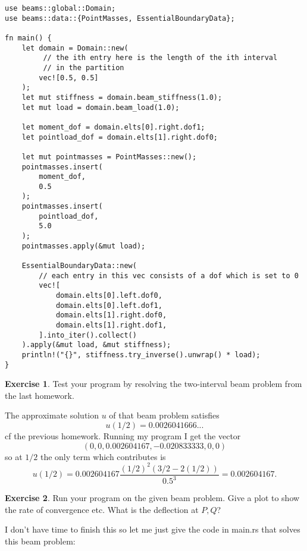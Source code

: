\documentclass[10pt]{article}
\theoremstyle{definition}
\newtheorem{exer}{Exercise}
\begin{document}
\begin{verbatim}
use beams::global::Domain;
use beams::data::{PointMasses, EssentialBoundaryData};

fn main() {
    let domain = Domain::new(
         // the ith entry here is the length of the ith interval
         // in the partition
        vec![0.5, 0.5]
    );
    let mut stiffness = domain.beam_stiffness(1.0);
    let mut load = domain.beam_load(1.0);

    let moment_dof = domain.elts[0].right.dof1;
    let pointload_dof = domain.elts[1].right.dof0;
    
    let mut pointmasses = PointMasses::new();
    pointmasses.insert(
        moment_dof,
        0.5
    );
    pointmasses.insert(
        pointload_dof,
        5.0
    );
    pointmasses.apply(&mut load);

    EssentialBoundaryData::new(
        // each entry in this vec consists of a dof which is set to 0
        vec![
            domain.elts[0].left.dof0,
            domain.elts[0].left.dof1, 
            domain.elts[1].right.dof0,
            domain.elts[1].right.dof1,
        ].into_iter().collect()
    ).apply(&mut load, &mut stiffness);
    println!("{}", stiffness.try_inverse().unwrap() * load);
}
\end{verbatim}

\begin{exer}
Test your program by resolving the two-interval beam problem from the last homework.
\end{exer}

The approximate solution $u$ of that beam problem satisfies 
$$u(1/2) = 0.0026041666...$$
cf the previous homework. Running my program I get the vector 
$$(0, 0, 0.002604167, -0.020833333, 0, 0)$$
so at $1/2$ the only term which contributes is 
$$u(1/2) = 0.002604167 \frac{(1/2)^2(3/2 - 2(1/2))}{0.5^3} = 0.002604167.$$

\begin{exer}
Run your program on the given beam problem. Give a plot to show the rate of convergence etc.
What is the deflection at $P, Q$?
\end{exer}

I don't have time to finish this so let me just give the code in main.rs that solves this beam problem:
\end{document}
